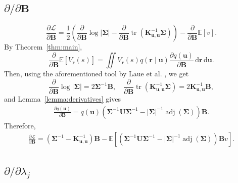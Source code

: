 \documentclass{mpaper}
\DeclareMathOperator{\adj}{adj}
\DeclareMathOperator{\tr}{tr}
\newcommand{\V}{V_{\mathbf{r}}}
\newcommand{\dx}{\,\mathrm{d}\mathbf{r}\,\mathrm{d}\mathbf{u}}
\newcommand{\Kuu}{\mathbf{K}_{\mathbf{u},\mathbf{u}}}
\newcommand{\dB}{\frac{\partial}{\partial\mathbf{B}}}
\begin{document}
\subsection{\texorpdfstring{$\partial/\partial\mathbf{B}$}{Derivative w.r.t. B}}

\[
  \frac{\partial\mathcal{L}}{\partial\mathbf{B}} =
  \frac{1}{2} \left( \dB\log|\bm\Sigma| - \dB\tr \left( \Kuu^{-1} \bm\Sigma
    \right) \right)
  - \dB\mathbb{E}[v].
\]
By Theorem~\ref{thm:main},
\[
  \dB\mathbb{E}[\V(s)] = \iint \V(s) q(\mathbf{r} \mid \mathbf{u})
  \frac{\partial q(\mathbf{u})}{\partial \mathbf{B}}\dx.
\]
Then, using the aforementioned tool by Laue et al.
\cite{DBLP:conf/nips/LaueMG18}, we get
\[
  \dB\log|\bm\Sigma| = 2\bm\Sigma^{-1}\mathbf{B}, \quad \dB \tr \left( \Kuu^{-1}
    \bm\Sigma \right) = 2\Kuu^{-1}\mathbf{B},
\]
and Lemma~\ref{lemma:derivatives} gives
\begin{gather*}
  \frac{\partial q(\mathbf{u})}{\partial \mathbf{B}} =
  q(\mathbf{u})(\bm\Sigma^{-1}\mathbf{U}\bm\Sigma^{-1} -
  |\bm\Sigma|^{-1}\adj(\bm\Sigma))\mathbf{B}.
\end{gather*}
Therefore,
\begin{gather*}
  \frac{\partial \mathcal{L}}{\partial \mathbf{B}} =
  \left( \bm\Sigma^{-1} - \Kuu^{-1} \right) \mathbf{B} - \mathbb{E}
  [(\bm\Sigma^{-1}\mathbf{U}\bm\Sigma^{-1} -
  |\bm\Sigma|^{-1}\adj(\bm\Sigma))\mathbf{B}v].
\end{gather*}

\subsection{\texorpdfstring{$\partial/\partial \lambda_j$}{Derivative w.r.t.
    Lambda}}
\end{document}
